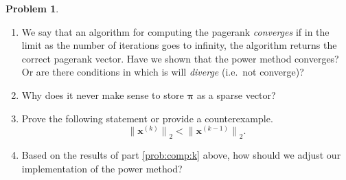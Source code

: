 \documentclass[10pt]{article}
\theoremstyle{definition}
\newtheorem{problem}{Problem}
\newcommand{\pr}{\bm \pi}
\newcommand{\x}{\mathbf x}
\newcommand{\ltwo}[1]{{\lVert {#1} \rVert}_2}
\begin{document}
\begin{problem}
\begin{enumerate}
        \item
            We say that an algorithm for computing the pagerank \emph{converges} if in the limit as the number of iterations goes to infinity, the algorithm returns the correct pagerank vector.
            Have we shown that the power method converges?
            Or are there conditions in which is will \emph{diverge} (i.e.\ not converge)?
            \vspace{2in}

        \item
            Why does it never make sense to store $\pr$ as a sparse vector?
            \vspace{2in}

        \item
            \label{prob:comp:k}
            Prove the following statement or provide a counterexample.
            \begin{equation}
                \ltwo{\x^{(k)}} < \ltwo{\x^{(k-1)}}
                .
            \end{equation}
            \vspace{4in}
        \item
            Based on the results of part \ref{prob:comp:k} above,
            how should we adjust our implementation of the power method?

    \end{enumerate}
\end{problem}

\end{document}
